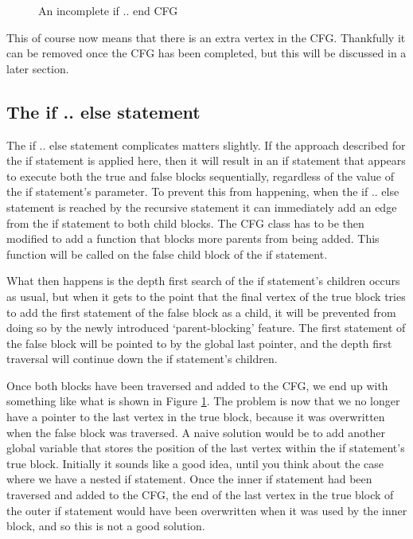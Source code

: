 \begin{figure}
\centering
\begin{minipage}{.6\textwidth}
  \centering
  	
\end{minipage}%
\begin{minipage}{.4\textwidth}
  \centering
  \caption{An incomplete if .. end CFG}
  \label{fig:ifElseNoEnd}
\end{minipage}
\end{figure}



This of course now means that there is an extra vertex in the CFG. Thankfully it can be removed once the CFG has been completed, but this will be discussed in a later section.

\subsection{The if .. else statement}

The if .. else statement complicates matters slightly. If the approach described for the if statement is applied here, then it will result in an if statement that appears to execute both the true and false blocks sequentially, regardless of the value of the if statement's parameter. To prevent this from happening, when the if .. else statement is reached by the recursive statement it can immediately add an edge from the if statement to both child blocks. The CFG class has to be then modified to add a function that blocks more parents from being added. This function will be called on the false child block of the if statement.

What then happens is the depth first search of the if statement's children occurs as usual, but when it gets to the point that the final vertex of the true block tries to add the first statement of the false block as a child, it will be prevented from doing so by the newly introduced `parent-blocking' feature. The first statement of the false block will be pointed to by the global last pointer, and the depth first traversal will continue down the if statement's children.

Once both blocks have been traversed and added to the CFG, we end up with something like what is shown in Figure \ref{fig:ifElseNoEnd}. The problem is now that we no longer have a pointer to the last vertex in the true block, because it was overwritten when the false block was traversed. A naive solution would be to add another global variable that stores the position of the last vertex within the if statement's true block. Initially it sounds like a good idea, until you think about the case where we have a nested if statement. Once the inner if statement had been traversed and added to the CFG, the end of the last vertex in the true block of the outer if statement would have been overwritten when it was used by the inner block, and so this is not a good solution.

